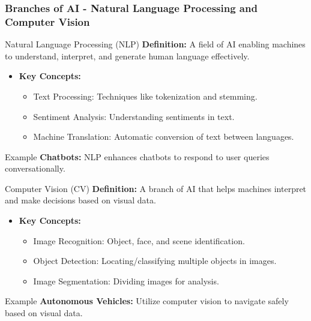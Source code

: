 \documentclass[aspectratio=169]{beamer}
\begin{document}
\begin{frame}[fragile]
    \frametitle{Branches of AI - Natural Language Processing and Computer Vision}
    \begin{block}{Natural Language Processing (NLP)}
        \textbf{Definition:} A field of AI enabling machines to understand, interpret, and generate human language effectively.
    \end{block}
    
    \begin{itemize}
        \item \textbf{Key Concepts:}
        \begin{itemize}
            \item Text Processing: Techniques like tokenization and stemming.
            \item Sentiment Analysis: Understanding sentiments in text.
            \item Machine Translation: Automatic conversion of text between languages.
        \end{itemize}
    \end{itemize}

    \begin{block}{Example}
        \textbf{Chatbots:} NLP enhances chatbots to respond to user queries conversationally.
    \end{block}

    \begin{block}{Computer Vision (CV)}
        \textbf{Definition:} A branch of AI that helps machines interpret and make decisions based on visual data.
    \end{block}
    
    \begin{itemize}
        \item \textbf{Key Concepts:}
        \begin{itemize}
            \item Image Recognition: Object, face, and scene identification.
            \item Object Detection: Locating/classifying multiple objects in images.
            \item Image Segmentation: Dividing images for analysis.
        \end{itemize}
    \end{itemize}

    \begin{block}{Example}
        \textbf{Autonomous Vehicles:} Utilize computer vision to navigate safely based on visual data.
    \end{block}
\end{frame}
\end{document}
